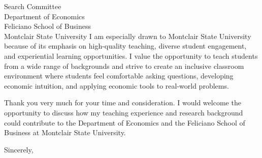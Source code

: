 \documentclass[11pt]{letter}
\begin{document}
\begin{letter}{Search Committee \\
Department of Economics \\
Feliciano School of Business \\
Montclair State University}
I am especially drawn to Montclair State University because of its emphasis on high-quality teaching, diverse student engagement, and experiential learning opportunities. I value the opportunity to teach students from a wide range of backgrounds and strive to create an inclusive classroom environment where students feel comfortable asking questions, developing economic intuition, and applying economic tools to real-world problems.

Thank you very much for your time and consideration. I would welcome the opportunity to discuss how my teaching experience and research background could contribute to the Department of Economics and the Feliciano School of Business at Montclair State University.

\closing{Sincerely,}

\end{letter}
\end{document}
